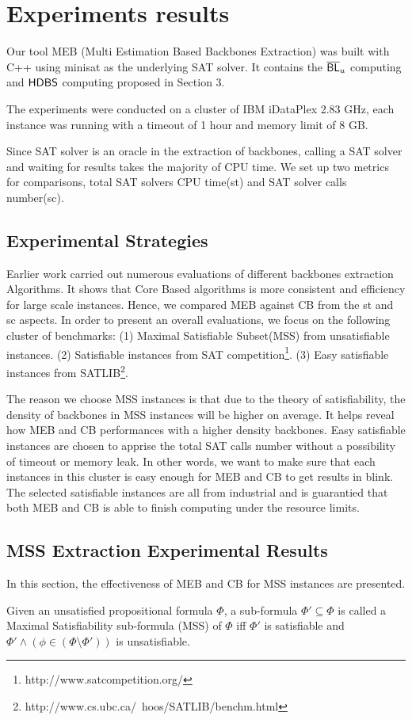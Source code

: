 \section{Experiments results}\label{sec:expr}

Our tool MEB (Multi Estimation Based Backbones Extraction) was built with C++ using minisat\cite{MINISAT} as the underlying SAT solver. It contains the $\overline{\textsf{BL}}_u$ computing and $\textsf{HDBS}$ computing proposed in Section 3.

The experiments were conducted on a cluster of IBM iDataPlex 2.83 GHz, each instance was running with a timeout of 1 hour and memory limit of 8 GB.

Since SAT solver is an oracle in the extraction of backbones, calling a SAT solver and waiting for results takes the majority of CPU time. We set up two metrics for comparisons, total SAT solvers CPU time(st) and SAT solver calls number(sc).

\subsection{Experimental Strategies}

Earlier work\cite{JLM15} carried out numerous evaluations of different backbones extraction Algorithms. It shows that Core Based algorithms is more consistent and efficiency for large scale instances. Hence, we compared MEB against CB from the st and sc aspects.
In order to present an overall evaluations, we focus on the following cluster of benchmarks: (1) Maximal Satisfiable Subset(MSS) from unsatisfiable instances. (2) Satisfiable instances from SAT competition\footnote{http://www.satcompetition.org/}. (3) Easy satisfiable instances from SATLIB\footnote{http://www.cs.ubc.ca/~hoos/SATLIB/benchm.html}.

The reason we choose MSS instances is that due to the theory of satisfiability, the density of backbones in MSS instances will be higher on average. It helps reveal how MEB and CB performances with a higher density backbones.
Easy satisfiable instances are chosen to apprise the total SAT calls number without a possibility of timeout or memory leak. In other words, we want to make sure that each instances in this cluster is easy enough for MEB and CB to get results in blink.
The selected satisfiable instances are all from industrial and is guarantied that both MEB and CB is able to finish computing under the resource limits.

\subsection{MSS Extraction Experimental Results}
In this section, the effectiveness of MEB and CB for MSS instances are presented.
\begin{definition}
Given an unsatisfied propositional formula $\Phi$, a sub-formula $\Phi'\subseteq\Phi$ is called a Maximal Satisfiability sub-formula (MSS) of $\Phi$ iff $\Phi'$ is satisfiable and $\Phi'\wedge(\phi\in(\Phi\setminus\Phi'))$ is unsatisfiable.
\end{definition}

